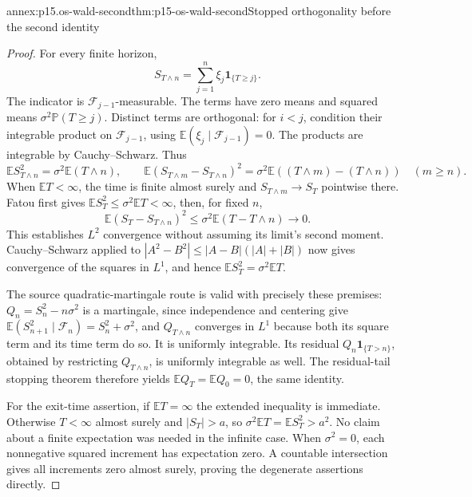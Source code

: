 \begin{annexitem}{annex:p15.os-wald-second}{thm:p15-os-wald-second}{Stopped orthogonality before the second identity}
\begin{proof}
For every finite horizon,
\[
 S_{T\wedge n}=\sum_{j=1}^n\xi_j\mathbf1_{\{T\geq j\}}.
 \]
The indicator is \(\mathcal F_{j-1}\)-measurable.
The terms have zero means and squared means
\(\sigma^2\mathbb P(T\geq j)\).
Distinct terms are orthogonal: for \(i<j\), condition their
integrable product on \(\mathcal F_{j-1}\), using
\(\mathbb E(\xi_j\mid\mathcal F_{j-1})=0\).
The products are integrable by Cauchy--Schwarz.
Thus
\[
 \mathbb ES_{T\wedge n}^2=\sigma^2\mathbb E(T\wedge n),
 \qquad
 \mathbb E(S_{T\wedge m}-S_{T\wedge n})^2
   =\sigma^2\mathbb E((T\wedge m)-(T\wedge n))\quad(m\geq n).
 \]
When \(\mathbb ET<\infty\), the time is finite almost surely
and \(S_{T\wedge m}\to S_T\) pointwise there.
Fatou first gives \(\mathbb ES_T^2\leq\sigma^2\mathbb ET<\infty\),
then, for fixed \(n\),
\[
 \mathbb E(S_T-S_{T\wedge n})^2
 \leq\sigma^2\mathbb E(T-T\wedge n)\to0.
 \]
This establishes \(L^2\) convergence without assuming its limit's
second moment. Cauchy--Schwarz applied to
\(|A^2-B^2|\leq|A-B|(|A|+|B|)\) now gives convergence
of the squares in \(L^1\), and hence
\(\mathbb ES_T^2=\sigma^2\mathbb ET\).

The source quadratic-martingale route is valid with precisely
these premises: \(Q_n=S_n^2-n\sigma^2\) is a martingale,
since independence and centering give
\(\mathbb E(S_{n+1}^2\mid\mathcal F_n)=S_n^2+\sigma^2\),
and \(Q_{T\wedge n}\) converges in \(L^1\) because both its
square term and its time term do so. It is uniformly integrable.
Its residual \(Q_n\mathbf1_{\{T>n\}}\), obtained by restricting
\(Q_{T\wedge n}\), is uniformly integrable as well.
The residual-tail stopping theorem therefore yields
\(\mathbb EQ_T=\mathbb EQ_0=0\), the same identity.

For the exit-time assertion, if \(\mathbb ET=\infty\) the
extended inequality is immediate. Otherwise \(T<\infty\)
almost surely and \(|S_T|>a\), so
\(\sigma^2\mathbb ET=\mathbb ES_T^2>a^2\).
No claim about a finite expectation was needed in the infinite case.
When \(\sigma^2=0\), each nonnegative squared increment has
expectation zero. A countable intersection gives all increments
zero almost surely, proving the degenerate assertions directly.
\end{proof}
\end{annexitem}

